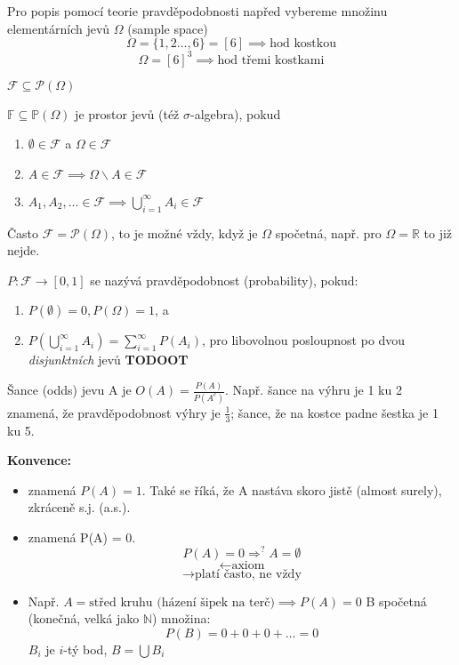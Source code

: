 \documentclass[../main.tex]{subfiles}
\begin{document}
\noindent
Pro popis pomocí teorie pravděpodobnosti napřed vybereme množinu elementárních jevů $\Omega$
(sample space)
\[\Omega = \{1,2\dots,6\} = [6] \implies \text{hod kostkou}\]
\[\Omega = [6]^3 \implies \text{hod třemi kostkami}\]

\begin{definition}
    $\mathcal{F} \subseteq \mathcal{P}(\Omega)$

    $\mathbb{F} \subseteq \mathbb{P}(\Omega)$ je prostor jevů (též $\sigma$-algebra), pokud
    \begin{enumerate}
        \item $\emptyset \in \mathcal{F}$ a $\Omega \in \mathcal{F}$
        \item $A \in \mathcal{F} \implies \Omega \backslash A \in \mathcal{F}$
        \item $A_1,A_2,... \in \mathcal{F} \implies \bigcup_{i=1}^{\infty}A_i \in \mathcal{F}$
    \end{enumerate}
\end{definition}

\noindent
Často $\mathcal{F} = \mathcal{P}(\Omega)$, to je možné vždy, když je $\Omega$ spočetná,
např. pro $\Omega = \mathbb{R}$ to již nejde.

\begin{definition}[Pravděpodobnost]
    $P:\mathcal{F} \rightarrow [0,1]$ se nazývá pravděpodobnost (probability), pokud:
    \begin{enumerate}
        \item $P(\emptyset) = 0, P(\Omega) = 1$, a
        \item $P(\bigcup^\infty_{i=1}A_i) = \sum^\infty_{i=1}P(A_i)$, pro libovolnou posloupnost po dvou \textit{disjunktních} jevů \textbf{TODOOT}
    \end{enumerate}
    Šance (odds) jevu A je $O(A) = \frac{P(A)}{P(A^c)}$. Např. šance na výhru je 1 ku 2 znamená, že
    pravděpodobnost výhry je $\frac{1}{3}$; šance, že na kostce padne šestka je 1 ku 5.
\end{definition}

\noindent
\textbf{Konvence:}
\begin{itemize}
    \item
     znamená $P(A) = 1.$ Také se říká, že A nastáva skoro jistě (almost surely), zkráceně s.j. (a.s.).

    \item
     znamená P(A) = 0.
    \[P(A) = 0 \Rightarrow^? A = \emptyset\]
    \[\leftarrow \text{axiom}\]
    \[\rightarrow \text{platí často, ne vždy}\]

    \item
    Např. $A = {\text{střed kruhu (házení šipek na terč})} \implies P(A) = 0$
    B spočetná (konečná, velká jako $\mathbb{N}$) množina:
    \[P(B) = 0+0+0+\dots=0\]
    $B_i$ je $i$-tý bod,
    $B = \bigcup B_i$
\end{itemize}
\end{document}
